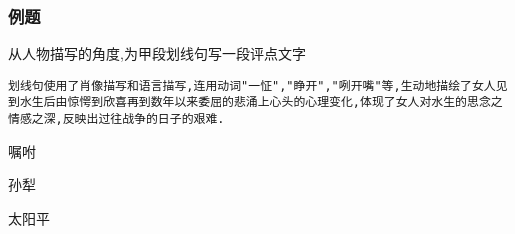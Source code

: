 \documentclass{ctexart}
\newcommand{\nm}{\normalsize}
\renewcommand{\\}{\par}
\begin{document}
\subsubsection{例题}
\large 
从人物描写的角度,为甲段划线句写一段评点文字\\
\texttt{划线句使用了肖像描写和语言描写,连用动词"一怔","睁开","咧开嘴"等,生动地描绘了女人见到水生后由惊愕到欣喜再到数年以来委屈的悲涌上心头的心理变化,体现了女人对水生的思念之情感之深,反映出过往战争的日子的艰难.}\\
\nm \fangsong \\\begin{center}嘱咐\end{center}\\\begin{center}孙犁\end{center}\\太阳平
\end{document}
